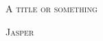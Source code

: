 
{\pagestyle{empty}

\centering

\null\vfill

\fontsize{20}{24}\selectfont

\textsc{A title or something} \vspace{12pt}

\hline

\vspace{12pt}

\textsc{Jasper}\vspace{240pt}

\vfill

\clearpage}